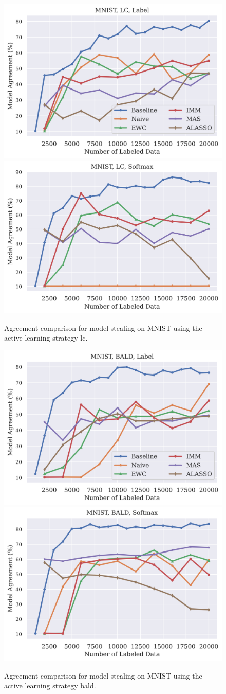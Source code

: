 \begin{figure}[!htb]
    \centering
    \includegraphics[width=0.48\linewidth]{images/results_CALMS/mnist_label_lc.png} \hfill
    \includegraphics[width=0.48\linewidth]{images/results_CALMS/mnist_softmax_lc.png}
    \caption{Agreement comparison for model stealing on MNIST using the active learning strategy \gls{lc}.}
    \label{fig:CALMSMNISTLC}
\end{figure}

\begin{figure}[!htb]
    \centering
    \includegraphics[width=0.48\linewidth]{images/results_CALMS/mnist_label_bald.png} \hfill
    \includegraphics[width=0.48\linewidth]{images/results_CALMS/mnist_softmax_bald.png}
    \caption{Agreement comparison for model stealing on MNIST using the active learning strategy \gls{bald}.}
    \label{fig:CALMSMNISTBALD}
\end{figure}

